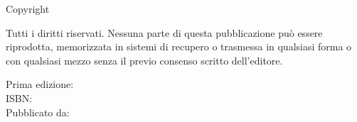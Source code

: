 \thispagestyle{empty}
\vspace*{\fill}

\noindent
Copyright \textcopyright\ \editionyear\ \authorname

\vspace{0.5em}

\noindent
\small
Tutti i diritti riservati. Nessuna parte di questa pubblicazione può essere
riprodotta, memorizzata in sistemi di recupero o trasmessa in qualsiasi forma
o con qualsiasi mezzo senza il previo consenso scritto dell'editore.

\vspace{1em}

\noindent
Prima edizione: \editionyear\\
ISBN: \isbn\\
Pubblicato da: \publisher

\normalsize
